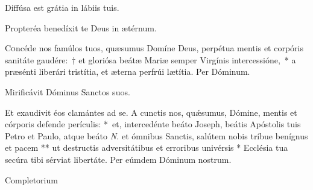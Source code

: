 \documentclass[vesperale_romanum.tex]{subfiles}
\begin{document}
\altertonus


\vv Diffúsa est grátia in lábiis tuis.

\rr Propteréa benedíxit te Deus in ætérnum.

\label{an_beata_mater_in_sabbato_solesmes_1961}


\oratio \label{oratio_bmv}

\lettrine{C}{o}ncéde nos famúlos tuos, quæsumus Domíne Deus, perpétua mentis et corpóris sanitáte gaudére:~† et gloriósa beátæ Mariæ semper Virgínis intercessióne,~* a præsénti liberári tristítia, et æterna perfrúi lætítia. Per Dóminum.





\vv Mirificávit Dóminus Sanctos suos.

\rr Et exaudivit éos clamántes ad se.
%
\oratio
%
\lettrine{A}{} cunctis nos, quǽsumus, Dómine, mentis et córporis defende perículis: \nolinebreak[4]*~et, intercedénte beáto Joseph, beátis Apóstolis tuis Petro et Paulo, atque beáto \textit{N.} et ómnibus Sanctis, salútem nobis tríbue benígnus et pacem ** ut destructis adversitátibus et erroribus univérsis * Ecclésia tua secúra tibi sérviat libertáte. Per eúmdem Dóminum nostrum.



Completorium  %

\end{document}
